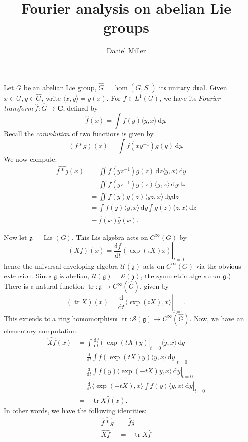 \documentclass{article}
\title{Fourier analysis on abelian Lie groups}
\author{Daniel Miller}
\DeclareMathOperator{\lie}{Lie}
\DeclareMathOperator{\tr}{tr}
\newcommand{\bC}{\mathbf{C}}
\newcommand{\cU}{\mathcal{U}}
\newcommand{\cS}{\mathcal{S}}
\newcommand{\dd}{\mathrm{d}}
\newcommand{\fg}{\mathfrak{g}}
\begin{document}
\maketitle





Let $G$ be an abelian Lie group, $\widehat G=\hom(G,S^1)$ its unitary dual. 
Given $x\in G, y\in \widehat G$, write $\langle x,y\rangle = y(x)$. For 
$f\in L^1(G)$, we have its \emph{Fourier transform} 
$\widehat f\colon \widehat G\to \bC$, defined by
\[
	\widehat f(x) = \int f(y)\langle y,x\rangle\, \dd y .
\]
Recall the \emph{convolution} of two functions is given by 
\[
	(f\ast g)(x) = \int f(x y^{-1}) g(y)\, \dd y .
\]
We now compute:
\begin{align*}
	\widehat{f\ast g}(x) 
		&= \iint f(y z^{-1}) g(z)\, \dd z \langle y,x\rangle\, \dd y \\
		&= \iint f(y z^{-1}) g(z) \langle y,x\rangle\, \dd y\dd z \\
		&= \iint f(y) g(z)\langle y z, x\rangle\, \dd y \dd z \\
		&= \int f(y)\langle y,x\rangle\, \dd y \int g(z) \langle z,x\rangle\, \dd z \\
		&= \widehat f(x) \widehat g(x) .
\end{align*}

Now let $\fg=\lie(G)$. This Lie algebra acts on $C^\infty(G)$ by 
\[
	(X f)(x) = \left.\frac{\dd f}{\dd t}(\exp(t X)x)\right|_{t=0}
\]
hence the universal enveloping algebra $\cU(\fg)$ acts on $C^\infty(G)$ via the 
obvious extension. Since $\fg$ is abelian, $\cU(\fg)=\cS(\fg)$, the symmetric 
algebra on $\fg$.) There is a natural function 
$\tr\colon \fg\to C^\infty(\widehat G)$, given by 
\[
	(\tr X)(x) = \left.\frac{\dd}{\dd t}\langle \exp(t X), x\rangle\right|_{t=0} .
\]
This extends to a ring homomorphism 
$\tr\colon \cS(\fg)\to C^\infty(\widehat G)$. Now, we have an elementary 
computation:
\begin{align*}
	\widehat{X f}(x) 
		&= \int \left.\frac{\dd f}{\dd t} (\exp(t X) y)\right|_{t=0} \langle y,x\rangle\, \dd y \\
		&= \left.\frac{\dd}{\dd t} \int f(\exp(t X) y)\langle y,x\rangle\, \dd y\right|_{t=0} \\
		&= \left.\frac{\dd}{\dd t} \int f(y) \langle \exp(-t X) y, x\rangle\, \dd y\right|_{t=0} \\
		&= \left.\frac{\dd}{\dd t} \langle \exp(-t X), x\rangle \int f(y) \langle y,x\rangle\, \dd y\right|_{t=0} \\
		&= -\tr X \widehat f(x) .
\end{align*}
In other words, we have the following identities:
\begin{align*}
	\widehat{f\ast g} &= \widehat f \widehat g \\
	\widehat{X f} &= -\tr X \widehat f
\end{align*}
\end{document}
